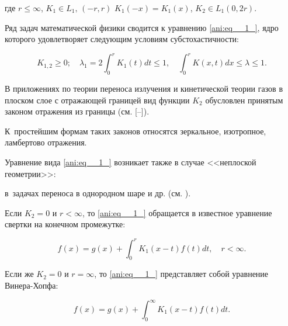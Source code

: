 где $ r\le \infty $, $K_{1} \in L_{1},\, \left(-r,r\right)$ $K_{1} \left(-x\right)=K_{1}  (x) $, $K_{2} \in L_{1} (0, 2r )$.



Ряд задач математической физики сводится  к  уравнению \eqref{ani:eq__1_}, ядро которого удовлетворяет следующим условиям субстохастичности:

\begin{equation}

\label{ani:eq2}

K_{1,2} \ge 0; \quad 

\lambda _{1} =  2\int _{0}^{r}K_{1} (t)dt\le 1, \quad  

\int _{0}^{r}K(x, t)dx \le \lambda \le 1.

\end{equation}



В приложениях по теории переноса излучения и кинетической теории газов в плоском слое с отражающей границей вид функции $K_{2} $ обусловлен принятым законом отражения из границы (см. [--]). 

К~простейшим формам таких законов относятся зеркальное, изотропное, ламбертово отражения.



Уравнение  вида \eqref{ani:eq__1_} возникает также в случае <<неплоской геометрии>>: 

в~задачах переноса в однородном шаре и др. (см. \cite{ani:AV}).



Если $K_{2} =0$ и $r<\infty $, то \eqref{ani:eq__1_} обращается в известное уравнение свертки на конечном промежутке:

\begin{equation} 

\label{ani:eq__3_} 

f (x) =g (x) +\int _{0}^{r} K_{1}  (x-t) f (t) dt, \quad   r<\infty.

\end{equation}



Если же $K_{2} =0$ и  $r=\infty $, то \eqref{ani:eq__1_} представляет собой уравнение Винера-Хопфа:

\begin{equation} \label{ani:eq__4_}

f (x) =g (x) +\int _{0}^{\infty } K_{1}  (x-t) f (t) dt.

\end{equation}



